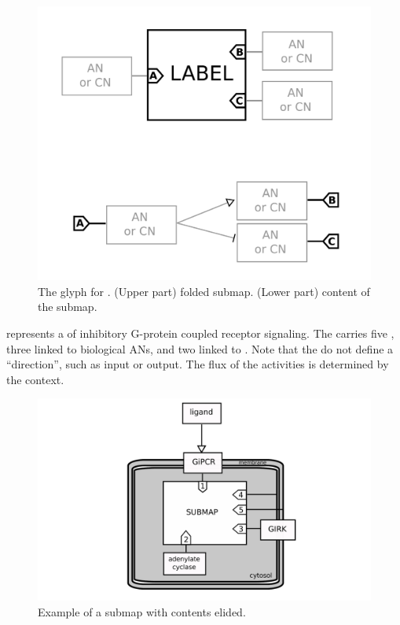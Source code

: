 \begin{figure}[H]
  \centering
  \includegraphics[scale = 0.3]{images/build/submap.pdf}
  \caption{The \AF glyph for . (Upper part) folded submap. (Lower part) content of the submap.}
  \label{fig:submap}
\end{figure}

 represents a  of inhibitory G-protein coupled receptor signaling. The  carries five , three linked to biological ANs, and two linked to .  Note that the  do not define a ``direction'', such as input or output.  The flux of the activities is determined by the context.

\begin{figure}[H]
  \centering
  \includegraphics[scale = 0.5]{examples/submap-folded.pdf}
  \caption{Example of a submap with contents elided.}
  \label{fig:submap-folded}
\end{figure}

